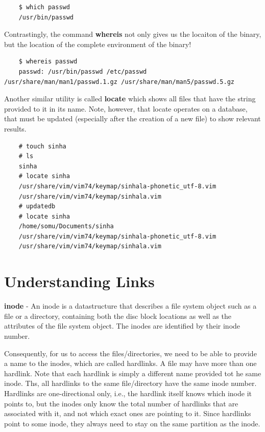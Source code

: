 \documentclass{report}
\begin{document}
	\begin{verbatim}
	$ which passwd
	/usr/bin/passwd
	\end{verbatim}
	
	\noindent
	Contrastingly, the command \textbf{whereis} not only gives us the locaiton of the binary, but the location of the complete environment of the binary!
	
	\begin{verbatim}
	$ whereis passwd
	passwd: /usr/bin/passwd /etc/passwd /usr/share/man/man1/passwd.1.gz /usr/share/man/man5/passwd.5.gz
	\end{verbatim}

	\noindent
	Another similar utility is called \textbf{locate} which shows all files that have the string provided to it in its name. Note, however, that locate operates on a database, that must be updated (especially after the creation of a new file) to show relevant results. 
	
	\begin{verbatim}
	# touch sinha
	# ls
	sinha
	# locate sinha
	/usr/share/vim/vim74/keymap/sinhala-phonetic_utf-8.vim
	/usr/share/vim/vim74/keymap/sinhala.vim
	# updatedb
	# locate sinha
	/home/somu/Documents/sinha
	/usr/share/vim/vim74/keymap/sinhala-phonetic_utf-8.vim
	/usr/share/vim/vim74/keymap/sinhala.vim
	\end{verbatim}
	
	\section{Understanding Links}
	\textbf{inode} - An inode is a datastructure that describes a file system object such as a file or a directory, containing both the disc block locations as well as the attributes of the file system object. The inodes are identified by their inode number.
	
	\noindent
	Consequently, for us to access the files/directories, we need to be able to provide a name to the inodes, which are called hardlinks. A file may have more than one hardlink. Note that each hardlink is simply a different name provided tot he same inode. Ths, all hardlinks to the same file/directory have the same inode number. Hardlinks are one-directional only, i.e., the hardlink itself knows which inode it points to, but the inodes only know the total number of hardlinks that are associated with it, and not which exact ones are pointing to it. Since hardlinks point to some inode, they always need to stay on the same partition as the inode.
	
\end{document}
